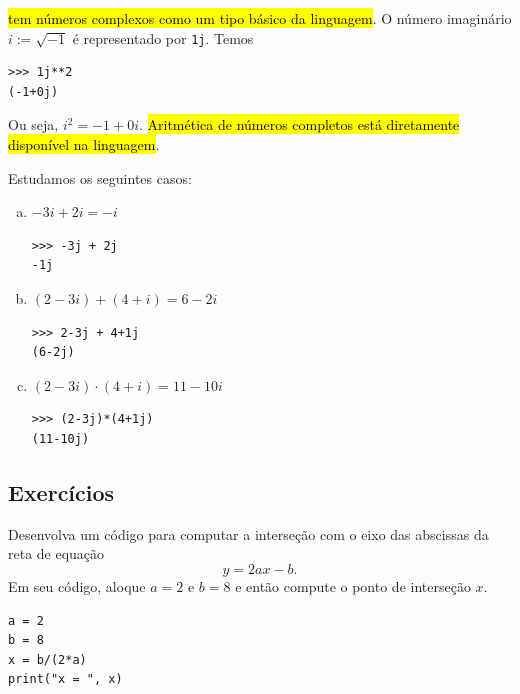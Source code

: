 \hl{{\python} tem números complexos como um tipo básico da linguagem}. O número imaginário $i := \sqrt{-1}$ é representado por \lstinline+1j+. Temos

\begin{lstlisting}
>>> 1j**2
(-1+0j)
\end{lstlisting}

Ou seja, $i^2 = -1 + 0i$. \hl{Aritmética de números completos está diretamente disponível na linguagem}.

\begin{ex}
  Estudamos os seguintes casos:
  \begin{enumerate}[a)]
  \item $-3i + 2i = -i$

\begin{lstlisting}[framexrightmargin=-1.5em]
>>> -3j + 2j
-1j
\end{lstlisting}

  \item $(2 - 3i) + (4 + i) = 6 -2i$

\begin{lstlisting}[framexrightmargin=-1.5em]
>>> 2-3j + 4+1j
(6-2j)
\end{lstlisting}

  \item $(2 - 3i)\cdot (4 + i) = 11 - 10i$

\begin{lstlisting}[framexrightmargin=-1.5em]
>>> (2-3j)*(4+1j)
(11-10j)
\end{lstlisting}

\end{enumerate}
\end{ex}

\subsection{Exercícios}

\begin{exer}
  Desenvolva um código {\python} para computar a interseção com o eixo das abscissas da reta de equação
  \begin{equation}
    y =  2ax - b.
  \end{equation}
  Em seu código, aloque $a=2$ e $b=8$ e então compute o ponto de interseção $x$.
\end{exer}
\begin{resp}

\begin{lstlisting}
a = 2
b = 8
x = b/(2*a)
print("x = ", x)
\end{lstlisting}

\end{resp}

